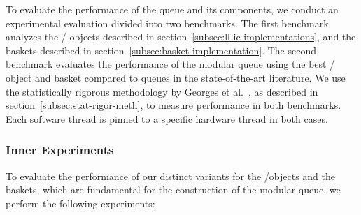 To evaluate the performance of the queue and its components, we conduct an experimental evaluation divided into two benchmarks. The first benchmark analyzes the \LL/\IC{} objects described in section~\ref{subsec:ll-ic-implementations}, and the baskets described in section~\ref{subsec:basket-implementation}. The second benchmark evaluates the performance of the modular queue using the best \LL/\IC{} object and basket compared to queues in the state-of-the-art literature. We use the statistically rigorous methodology by Georges et al.~\cite{DBLP_conf_oopsla_GeorgesBE07}, as described in section~\ref{subsec:stat-rigor-meth}, to measure performance in both benchmarks. Each software thread is pinned to a specific hardware thread in both cases.

\subsubsection{\label{subsubsec:queue-experiments-inner-experiments}Inner Experiments}

To evaluate the performance of our distinct variants for the \LL/\IC objects and the baskets, which are fundamental for the construction of the modular queue, we perform the following experiments:


